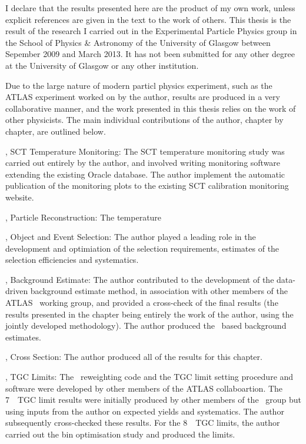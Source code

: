 I declare that the results presented here are the product of my own work, unless
explicit references are given in the text to the work of others. This thesis is
the result of the research I carried out in the Experimental Particle Physics
group in the School of Physics \& Astronomy of the University of Glasgow between
Sepember 2009 and March 2013. It has not been submitted for any other degree
at the University of Glasgow or any other institution.

Due to the large nature of modern particl physics experiment, such as the ATLAS
experiment worked on by the author, results are produced in a very collaborative
manner, and the work presented in this thesis relies on the work of other
physicists. The main individual contributions of the author, chapter by chapter, are outlined below.

, SCT Temperature Monitoring: The SCT temperature monitoring study was
carried out entirely by the author, and involved writing monitoring software
extending the existing Oracle database. The author implement the automatic
publication of the monitoring plots to the existing SCT calibration monitoring
website.

, Particle Reconstruction: The temperature

, Object and Event Selection: The author played a
leading role in the development and optimiation of the selection requirements,
estimates of the selection efficiencies and systematics.

, Background Estimate: The author contributed to the 
development of the data-driven background estimate method, in association with other members
of the ATLAS \ZZ\ working group, and provided a cross-check of the final
results (the results presented in the chapter being entirely the work of the
author, using the jointly developed methodology). The author produced the \mc\ based background estimates.

, Cross Section: The author produced all of the results for
this chapter.

, TGC Limits: The \AfterBurner\ reweighting code and the TGC
limit setting procedure and software were developed by other members of the
ATLAS collaboartion. The 7~\tev\ TGC limit results were initially produced by
other members of the \ZZ\ group but using inputs from the author on expected
yields and systematics. The author subsequently cross-checked these results. For
the 8~\tev\ TGC limits, the author carried out the bin optimisation study and
produced the limits.
